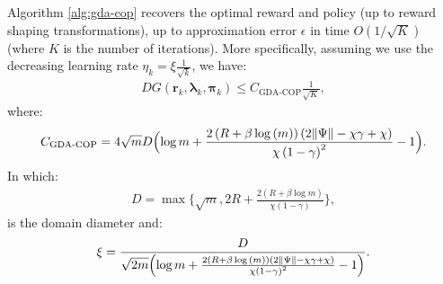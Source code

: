   \begin{theorem}
    \label{thm:GDA_COP_convergence}
    Algorithm \ref{alg:gda-cop} recovers the optimal reward and policy (up to reward shaping transformations), up to approximation error $\epsilon$ in time $O(1/\sqrt{K})$ (where $K$ is the number of iterations). More specifically, assuming we use the decreasing learning rate $\eta_k = \xi \frac{1}{\sqrt{k}}$, we have: 
    \begin{align*}
        DG(\bm{r}_k,\bm{\lambda}_k,\bm{\pi}_k) 
        \leq C_\text{GDA-COP} \frac{1}{\sqrt{K}},
    \end{align*}
    where:
    \begin{align*}
        C_\text{GDA-COP} = 4 
        \sqrt{m} 
        D
        \Bigl( \log m +
        \frac{2\left(R + \beta \log{\left(m \right)}\right) \left(2  \|\Psi\| - \chi \gamma + \chi\right)}{\chi \left(1- \gamma\right)^{2}} 
        -1
        \Bigr).
    \end{align*}
    In which: 
    \begin{align*}
        D = \max\Big\{
            \sqrt{m},
            2R 
            +\frac{2(R +\beta \log m)}{\chi (1-\gamma)} 
            \Big\} ,
    \end{align*}
    is the domain diameter and:
    \begin{align*}
        \xi = \frac{D}{\sqrt{2m} 
        \Bigl( \log m +
        \frac{2\left(R + \beta \log{\left(m \right)}\right) \left(2  \|\Psi\| - \chi \gamma + \chi\right)}{\chi \left(1- \gamma\right)^{2}} 
        -1
        \Bigr)}.
    \end{align*}
  \end{theorem}

